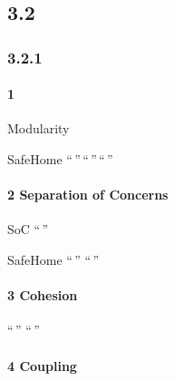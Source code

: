 \hypertarget{section-15}{%
\subsection{3.2}\label{section-15}}

\hypertarget{section-16}{%
\subsubsection{3.2.1}\label{section-16}}

\hypertarget{section-17}{%
\paragraph{1}\label{section-17}}

Modularity

\important{}

\important{}

\important{}

SafeHome ``\,''\,``\,''\,``\,''

\hypertarget{separation-of-concerns}{%
\paragraph{2 Separation of Concerns}\label{separation-of-concerns}}

SoC ``\,''

\important{}

\important{}

\important{}SafeHome ``\,'' ``\,''

\hypertarget{cohesion}{%
\paragraph{3 Cohesion}\label{cohesion}}




 ``\,'' ``\,''

\hypertarget{coupling}{%
\paragraph{4 Coupling}\label{coupling}}



